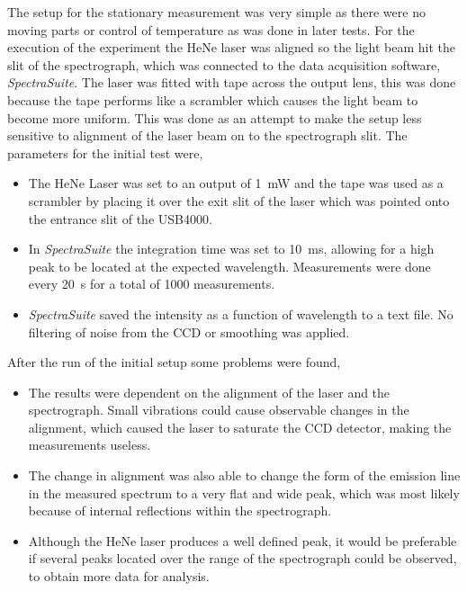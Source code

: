 The setup for the stationary measurement was very simple as there were no moving parts or control of temperature as was done in later tests. For the execution of the experiment the HeNe laser was aligned so the light beam hit the slit of the spectrograph, which was connected to the data acquisition software, \emph{SpectraSuite}. The laser was fitted with tape across the output lens, this was done because the tape performs like a scrambler which causes the light beam to become more uniform. This was done as an attempt to make the setup less sensitive to alignment of the laser beam on to the spectrograph slit. The parameters for the initial test were,

\begin{itemize}
\item The HeNe Laser was set to an output of \SI{1}{\milli\watt} and the tape was used as a scrambler by placing it over the exit slit of the laser which was pointed onto the entrance slit of the USB4000.
\item In \emph{SpectraSuite} the integration time was set to \SI{10}{\milli\second}, allowing for a high peak to be located at the expected wavelength. Measurements were done every \SI{20}{\second} for a total of \num{1000} measurements.
\item \emph{SpectraSuite} saved the intensity as a function of wavelength to a text file. No filtering of noise from the CCD or smoothing was applied.
\end{itemize}

After the run of the initial setup some problems were found,

\begin{itemize}
\item The results were dependent on the alignment of the laser and the spectrograph. Small vibrations could cause observable changes in the alignment, which caused the laser to saturate the CCD detector, making the measurements useless. 
\item The change in alignment was also able to change the form of the emission line in the measured spectrum to a very flat and wide peak, which was most likely because of internal reflections within the spectrograph.
\item Although the HeNe laser produces a well defined peak, it would be preferable if several peaks located over the range of the spectrograph could be observed, to obtain more data for analysis.
\end{itemize} 

